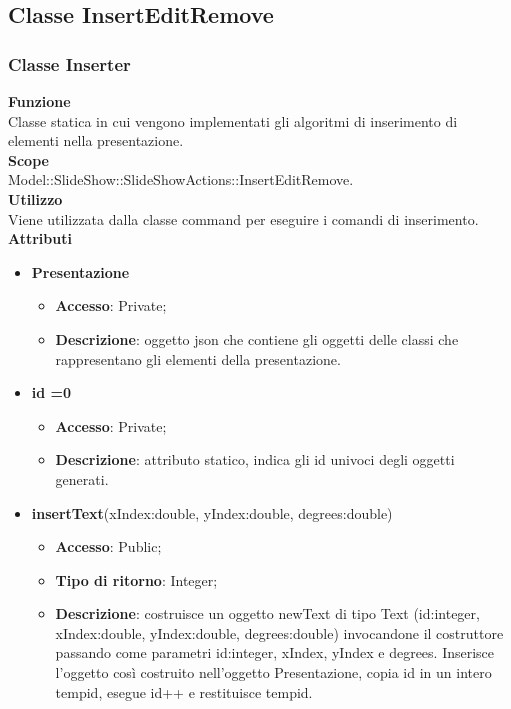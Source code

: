 \subsection{Classe InsertEditRemove}{
	\subsubsection{Classe Inserter}{
		\textbf{Funzione}\\
			\indent Classe statica in cui vengono implementati gli algoritmi di inserimento di elementi nella presentazione.\\
	   	\textbf{Scope}\\
			\indent Model::SlideShow::SlideShowActions::InsertEditRemove.\\
		\textbf{Utilizzo}\\
			\indent Viene utilizzata dalla classe command per eseguire i comandi di inserimento.\\
		\textbf{Attributi}
		\begin{itemize}
			\item \textbf{Presentazione}
			\begin{itemize}
				\item \textbf{Accesso}: Private;
				\item \textbf{Descrizione}: oggetto json che contiene gli oggetti delle classi che rappresentano gli elementi della presentazione.
			\end{itemize}
			\item \textbf{id =0}
			\begin{itemize}
				\item \textbf{Accesso}: Private;
				\item \textbf{Descrizione}: attributo statico, indica gli id univoci degli oggetti generati.
			\end{itemize}
		\end{itemize}
		\begin{itemize}
			\item \textbf{insertText}(xIndex:double, yIndex:double, degrees:double)
			\begin{itemize}
				\item \textbf{Accesso}: Public;
				\item \textbf{Tipo di ritorno}: Integer;
				\item \textbf{Descrizione}: costruisce un oggetto newText di tipo Text (id:integer, xIndex:double, yIndex:double, degrees:double) invocandone il costruttore passando come parametri id:integer, xIndex, yIndex e degrees. Inserisce l’oggetto così costruito nell’oggetto Presentazione, copia id in un intero tempid, esegue id++ e restituisce tempid.

\end{itemize}
\end{itemize}}}
